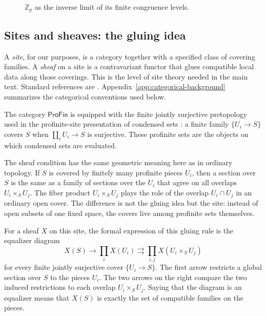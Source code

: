 \documentclass[10pt]{amsart}
\newcommand{\ProFin}{\mathsf{ProFin}}
\newcommand{\Z}{\mathbb{Z}}
\newcommand{\Zp}{\mathbb{Z}_p}
\theoremstyle{plain}
\theoremstyle{definition}
\begin{document}
\begin{figure}[htbp]
\centering
{}
\caption{$\Zp$ as the inverse limit of its finite congruence levels.}
\label{fig:zp-tower}
\end{figure}

\subsection{Sites and sheaves: the gluing idea}

A \emph{site}, for our purposes, is a category together with a specified class
of covering families. A \emph{sheaf} on a site is a contravariant functor that
glues compatible local data along those coverings. This is the level of site
theory needed in the main text. Standard references are
\cite{MacLaneMoerdijk,JohnstoneTopos}. Appendix~\ref{app:categorical-background}
summarizes the categorical conventions used below.

The category $\ProFin$ is equipped with the finite jointly surjective
pretopology used in the profinite-site presentation of condensed sets
\cite{ClausenScholze,LeStumCondensed}: a finite family $\{U_i\to S\}$ covers
$S$ when $\coprod_i U_i\to S$ is surjective. These profinite sets are the
objects on which condensed sets are evaluated.

The sheaf condition has the same geometric meaning here as in ordinary
topology. If $S$ is covered by finitely many profinite pieces $U_i$, then a
section over $S$ is the same as a family of sections over the $U_i$ that agree
on all overlaps $U_i\times_S U_j$. The fiber product $U_i\times_S U_j$ plays
the role of the overlap $U_i\cap U_j$ in an ordinary open cover. The difference
is not the gluing idea but the site: instead of open subsets of one fixed
space, the covers live among profinite sets themselves.

For a sheaf $X$ on this site, the formal expression of this gluing rule is the
equalizer diagram
\[
  X(S)\longrightarrow \prod_i X(U_i)
  \rightrightarrows \prod_{i,j}X(U_i\times_S U_j)
\]
for every finite jointly surjective cover $\{U_i\to S\}$. The first arrow
restricts a global section over $S$ to the pieces $U_i$. The two arrows on the
right compare the two induced restrictions to each overlap $U_i\times_S U_j$.
Saying that the diagram is an equalizer means that $X(S)$ is exactly the set of
compatible families on the pieces.
\end{document}

